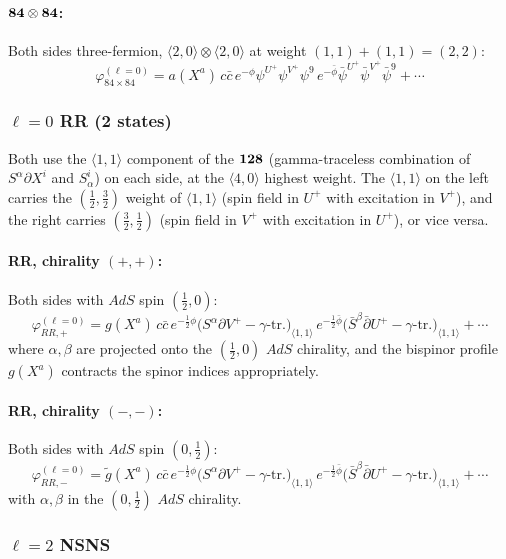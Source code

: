 \documentclass[12pt]{article}
\def\be{\begin{equation}}
\def\ee{\end{equation}}
\begin{document}
\paragraph{${\bf 84}\otimes{\bf 84}$:}
Both sides three-fermion, $\langle 2,0\rangle\otimes\langle 2,0\rangle$ at weight $(1,1)+(1,1)=(2,2)$:
\be\label{ell0_8484}
\varphi^{(\ell=0)}_{84\times 84}
= a(X^a)\, c\bar c\,
e^{-\phi}\psi^{U^+}\psi^{V^+}\psi^9\,
e^{-\bar\phi}\bar\psi^{U^+}\bar\psi^{V^+}\bar\psi^9
+\cdots
\ee

\subsubsection*{$\ell=0$ RR (2 states)}

Both use the $\langle 1,1\rangle$ component of the ${\bf 128}$ (gamma-traceless
combination of $S^\alpha\partial X^i$ and $S^i_\alpha$) on each side, at the $\langle 4,0\rangle$
highest weight. The $\langle 1,1\rangle$ on the left carries the $(\tfrac12,\tfrac32)$
weight of $\langle 1,1\rangle$ (spin field in $U^+$ with excitation in $V^+$),
and the right carries $(\tfrac32,\tfrac12)$ (spin field in $V^+$ with excitation in $U^+$),
or vice versa.

\paragraph{RR, chirality $(+,+)$:}
Both sides with $AdS$ spin $(\tfrac12,0)$:
\be\label{ell0_RR1}
\varphi^{(\ell=0)}_{RR,+}
= g(X^a)\, c\bar c\,
e^{-\frac{1}{2}\phi}\big(S^\alpha\partial V^+
-\text{$\gamma$-tr.}\big)_{\langle 1,1\rangle}\,
e^{-\frac{1}{2}\bar\phi}\big(\bar S^\beta\bar\partial U^+
-\text{$\gamma$-tr.}\big)_{\langle 1,1\rangle}
+\cdots
\ee
where $\alpha,\beta$ are projected onto the $(\tfrac12,0)$ $AdS$ chirality, and the
bispinor profile $g(X^a)$ contracts the spinor indices appropriately.

\paragraph{RR, chirality $(-,-)$:}
Both sides with $AdS$ spin $(0,\tfrac12)$:
\be\label{ell0_RR2}
\varphi^{(\ell=0)}_{RR,-}
= \tilde g(X^a)\, c\bar c\,
e^{-\frac{1}{2}\phi}\big(S^\alpha\partial V^+
-\text{$\gamma$-tr.}\big)_{\langle 1,1\rangle}\,
e^{-\frac{1}{2}\bar\phi}\big(\bar S^\beta\bar\partial U^+
-\text{$\gamma$-tr.}\big)_{\langle 1,1\rangle}
+\cdots
\ee
with $\alpha,\beta$ in the $(0,\tfrac12)$ $AdS$ chirality.

\subsubsection*{$\ell=2$ NSNS}
\end{document}
